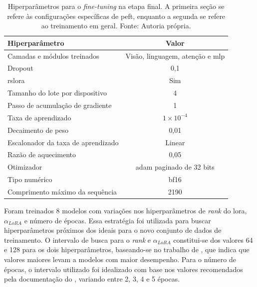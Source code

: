 \begin{table}[ht]
    \centering
    \begin{tabular}{l|c}
        \hline
        Hiperparâmetro                     & Valor                                  \\ \hline
        Camadas e módulos treinados        & Visão, linguagem, atenção e \ac{mlp}   \\
        Dropout                            & 0,1                                    \\
        \ac{rslora}                        & Sim                                    \\ \hline
        Tamanho do lote por dispositivo    & 4                                      \\
        Passo de acumulação de gradiente   & 1                                      \\
        Taxa de aprendizado                & \begin{math}1 \times 10^{-4}\end{math} \\
        Decaimento de peso                 & 0,01                                   \\
        Escalonador da taxa de aprendizado & Linear                                 \\
        Razão de aquecimento               & 0,05                                   \\
        Otimizador                         & \ac{adam} paginado de 32 bits          \\
        Tipo numérico                      & \ac{bf16}                              \\
        Comprimento máximo da sequência    & 2190                                   \\ \hline
    \end{tabular}
    \label{tab:final_config}
    \caption{Hiperparâmetros para o \textit{fine-tuning} na etapa final. A primeira seção se refere às
    configurações específicas de \ac{peft}, enquanto a segunda se refere ao treinamento em geral. Fonte: Autoria
    própria.}
\end{table}

Foram treinados 8 modelos com variações nos hiperparâmetros de \textit{rank} do \ac{lora},
\begin{math}\alpha_{LoRA}\end{math} e número de épocas. Essa estratégia foi utilizada para buscar hiperparâmetros
próximos dos ideais para o novo conjunto de dados de treinamento. O intervalo de busca para o \textit{rank} e
\begin{math}\alpha_{LoRA}\end{math} constitui-se dos valores 64 e 128 para os dois hiperparâmetros, baseando-se no
trabalho de \textcite{tribes2023hyperparameter}, que indica que valores maiores levam a modelos com maior desempenho.
Para o número de épocas, o intervalo utilizado foi idealizado com base nos valores recomendados pela documentação do
\textcite{unsloth2025lora}, variando entre 2, 3, 4 e 5 épocas.

